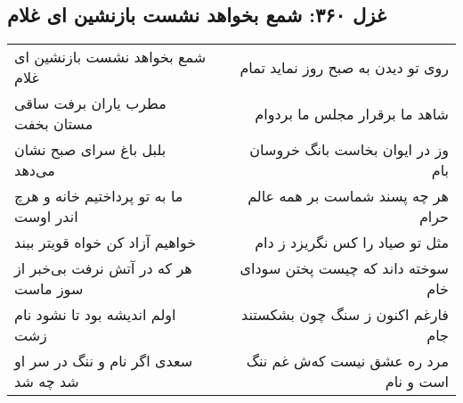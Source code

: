 \begin{center}
\section*{غزل ۳۶۰: شمع بخواهد نشست بازنشین ای غلام}
\label{sec:360}
\begin{longtable}{l p{0.5cm} r}
شمع بخواهد نشست بازنشین ای غلام
&&
روی تو دیدن به صبح روز نماید تمام
\\
مطرب یاران برفت ساقی مستان بخفت
&&
شاهد ما برقرار مجلس ما بردوام
\\
بلبل باغ سرای صبح نشان می‌دهد
&&
وز در ایوان بخاست بانگ خروسان بام
\\
ما به تو پرداختیم خانه و هرچ اندر اوست
&&
هر چه پسند شماست بر همه عالم حرام
\\
خواهیم آزاد کن خواه قویتر ببند
&&
مثل تو صیاد را کس نگریزد ز دام
\\
هر که در آتش نرفت بی‌خبر از سوز ماست
&&
سوخته داند که چیست پختن سودای خام
\\
اولم اندیشه بود تا نشود نام زشت
&&
فارغم اکنون ز سنگ چون بشکستند جام
\\
سعدی اگر نام و ننگ در سر او شد چه شد
&&
مرد ره عشق نیست که‌ش غم ننگ است و نام
\\
\end{longtable}
\end{center}
